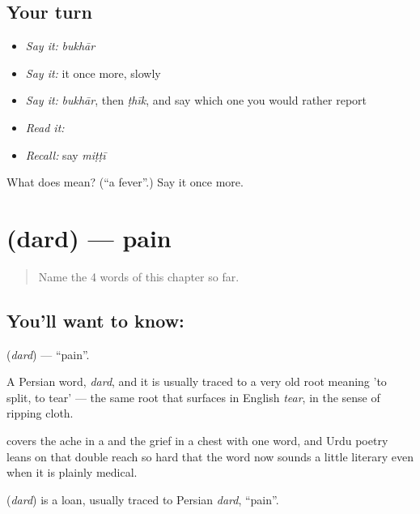 \subsection*{Your turn}
\begin{itemize}
\raggedright
  \item \emph{Say it:} \emph{bukhār}
  \item \emph{Say it:} it once more, slowly
  \item \emph{Say it:} \emph{bukhār}, then \emph{ṭhīk}, and say which one you would rather report
  \item \emph{Read it:} \textbf{}
  \item \emph{Recall:} say \emph{miṭṭī}
\end{itemize}

\begin{tcolorbox}[breakable,colback=teal!4,colframe=teal!35!black,title={Before you move on}]
What does  mean? (\textquotedblleft{}a fever\textquotedblright{}.) Say it once more.
\end{tcolorbox}
\section[\texorpdfstring{\hi{दर्द} (dard)}{दर्द (dard)}]{ (dard) — pain}

\label{lesson:HI-C63-pain}



\begin{quote}
Name the 4 words of this chapter so far.
\end{quote}

\subsection*{You'll want to know: }
\textbf{} (\emph{dard}) — \textquotedblleft{}pain\textquotedblright{}.

A Persian word, \emph{dard}, and it is usually traced to a very old root meaning 'to split, to tear' — the same root that surfaces in English \emph{tear}, in the sense of ripping cloth.

 covers the ache in a  and the grief in a chest with one word, and Urdu poetry leans on that double reach so hard that the word now sounds a little literary even when it is plainly medical.

\begin{cousinweb}
\textbf{} (\emph{dard}) is a loan, usually traced to Persian \emph{dard}, \textquotedblleft{}pain\textquotedblright{}.
\end{cousinweb}

